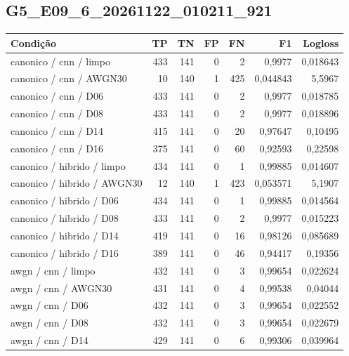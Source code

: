 \subsection{G5\_E09\_6\_20261122\_010211\_921}
\small\begin{longtable}{@{}p{.38\linewidth}rrrrrr@{}}
\toprule Condição & TP & TN & FP & FN & F1 & Logloss\\\midrule\endhead
canonico /\allowbreak{} cnn /\allowbreak{} limpo & 433 & 141 & 0 & 2 & 0,9977 & 0,018643\\
canonico /\allowbreak{} cnn /\allowbreak{} AWGN30 & 10 & 140 & 1 & 425 & 0,044843 & 5,5967\\
canonico /\allowbreak{} cnn /\allowbreak{} D06 & 433 & 141 & 0 & 2 & 0,9977 & 0,018785\\
canonico /\allowbreak{} cnn /\allowbreak{} D08 & 433 & 141 & 0 & 2 & 0,9977 & 0,018896\\
canonico /\allowbreak{} cnn /\allowbreak{} D14 & 415 & 141 & 0 & 20 & 0,97647 & 0,10495\\
canonico /\allowbreak{} cnn /\allowbreak{} D16 & 375 & 141 & 0 & 60 & 0,92593 & 0,22598\\
canonico /\allowbreak{} hibrido /\allowbreak{} limpo & 434 & 141 & 0 & 1 & 0,99885 & 0,014607\\
canonico /\allowbreak{} hibrido /\allowbreak{} AWGN30 & 12 & 140 & 1 & 423 & 0,053571 & 5,1907\\
canonico /\allowbreak{} hibrido /\allowbreak{} D06 & 434 & 141 & 0 & 1 & 0,99885 & 0,014564\\
canonico /\allowbreak{} hibrido /\allowbreak{} D08 & 433 & 141 & 0 & 2 & 0,9977 & 0,015223\\
canonico /\allowbreak{} hibrido /\allowbreak{} D14 & 419 & 141 & 0 & 16 & 0,98126 & 0,085689\\
canonico /\allowbreak{} hibrido /\allowbreak{} D16 & 389 & 141 & 0 & 46 & 0,94417 & 0,19356\\
awgn /\allowbreak{} cnn /\allowbreak{} limpo & 432 & 141 & 0 & 3 & 0,99654 & 0,022624\\
awgn /\allowbreak{} cnn /\allowbreak{} AWGN30 & 431 & 141 & 0 & 4 & 0,99538 & 0,04044\\
awgn /\allowbreak{} cnn /\allowbreak{} D06 & 432 & 141 & 0 & 3 & 0,99654 & 0,022552\\
awgn /\allowbreak{} cnn /\allowbreak{} D08 & 432 & 141 & 0 & 3 & 0,99654 & 0,022679\\
awgn /\allowbreak{} cnn /\allowbreak{} D14 & 429 & 141 & 0 & 6 & 0,99306 & 0,039964\\

\end{longtable}
